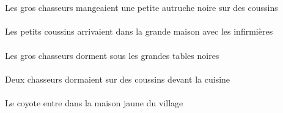 \begin{exe}
\ex\gll
\INDPlObl{}   \coussinBPlObl{}   \SUR{}   \DEFPlErg{}   \grosCPl{}   \chasseurCPlErg{}   \INDSgAbs{}   \petitBSg{}   \noirBSg{}   \autrucheBSgAbs{}  \mangerVtPstBSg{}\\
\INDPlOblP{}   \coussinBPlOblP{}   \SURP{}   \DEFPlErgP{}   \grosCPlP{}   \chasseurCPlErgP{}   \INDSgAbsP{}   \petitBSgP{}   \noirBSgP{}   \autrucheBSgAbsP{}  \mangerVtPstBSgP{}\\
Les gros chasseurs mangeaient une petite autruche noire sur des coussins
\ex\gll
\DEFPlObl{}   \infirmiereAPlObl{}   \AVEC{}   \DEFPlAbs{}   \petitBPl{}   \coussinBPlAbs{}    \DEFSgObl{}   \grandDSg{}   \maisonDSgObl{}   \DANS{}  \arriverViPstBPl{}\\
\DEFPlOblP{}   \infirmiereAPlOblP{}   \AVECP{}   \DEFPlAbsP{}   \petitBPlP{}   \coussinBPlAbsP{}    \DEFSgOblP{}   \grandDSgP{}   \maisonDSgOblP{}   \DANSP{}  \arriverViPstBPlP{}\\
Les petits coussins arrivaient dans la grande maison avec les infirmières
\ex\gll
\DEFPlAbs{}   \grosCPl{}   \chasseurCPlAbs{}    \DEFPlObl{}   \grandDPl{}   \noirDPl{}   \tableDPlObl{}   \SOUS{}  \dormirViPrsCPl{}\\
\DEFPlAbsP{}   \grosCPlP{}   \chasseurCPlAbsP{}    \DEFPlOblP{}   \grandDPlP{}   \noirDPlP{}   \tableDPlOblP{}   \SOUSP{}  \dormirViPrsCPlP{}\\
Les gros chasseurs dorment sous les grandes tables noires
\ex\gll
\DEFSgObl{}   \cuisineDSgObl{}   \DEVANT{}   \INDDuAbs{}   \chasseurCDuAbs{}    \INDPlObl{}   \coussinBPlObl{}   \SUR{}  \dormirViPstCDu{}\\
\DEFSgOblP{}   \cuisineDSgOblP{}   \DEVANTP{}   \INDDuAbsP{}   \chasseurCDuAbsP{}    \INDPlOblP{}   \coussinBPlOblP{}   \SURP{}  \dormirViPstCDuP{}\\
Deux chasseurs dormaient sur des coussins devant la cuisine
\ex\gll
\DEFSgAbs{}   \coyoteCSgAbs{}    \DEFSgObl{}    \DEFSgObl{}   \villageCSgObl{}   \DE{}   \jauneDSg{}   \maisonDSgObl{}   \DANS{}  \entrerViPrsCSg{}\\
\DEFSgAbsP{}   \coyoteCSgAbsP{}    \DEFSgOblP{}    \DEFSgOblP{}   \villageCSgOblP{}   \DEP{}   \jauneDSgP{}   \maisonDSgOblP{}   \DANSP{}  \entrerViPrsCSgP{}\\
Le coyote entre dans la maison jaune du village
\ex\gll
\DEFPlErg{}   \chasseurCPlErg{}    \DEFPlDat{}   \grandBPl{}   \autrucheBPlDat{}   \INDPlAbs{}   \jauneAPl{}   \fruitAPlAbs{}  \donnerVdPstAPl{}\\
\DEFPlErgP{}   \chasseurCPlErgP{}    \DEFPlDatP{}   \grandBPlP{}   \autrucheBPlDatP{}   \INDPlAbsP{}   \jauneAPlP{}   \fruitAPlAbsP{}  \donnerVdPstAPlP{}\\

\end{exe}
